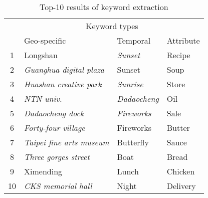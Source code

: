 \begin{table}[h]\scriptsize
\begin{center}
\caption{Top-10 results of keyword extraction}
\vspace{1mm}
{\scriptsize\begin{tabular}{ | c | p{24mm} | p{13mm}  | p{13mm} |}
    \hline
    & \multicolumn{3}{c|}{Keyword types} \\ 
    \cline{2-4}
     & \hspace{5mm} Geo-specific&\hspace{1mm}  Temporal &\hspace{1.5mm}  Attribute \\ \hline
    1 & Longshan &  \textit{Sunset}  & Recipe\\ \hline
    2 & \textit{Guanghua digital plaza} &  Sunset  & Soup \\ \hline
    3 & \textit{Huashan creative park} &  \textit{Sunrise}  & Store \\ \hline
    4 & \textit{NTN univ.} &  \textit{Dadaocheng}  & Oil \\ \hline
    5 & \textit{Dadaocheng dock} & \textit{Fireworks}   & Sale \\ \hline
    6 & \textit{Forty-four village}& Fireworks & Butter \\ \hline
    7 & \textit{Taipei fine arts museum} &  Butterfly   & Sauce \\ \hline
    8 & \textit{Three gorges street} & Boat   & Bread \\ \hline
    9 & Ximending & Lunch   & Chicken\\ \hline
    10 & \textit{CKS memorial hall} & Night  & Delivery \\ \hline
 \end{tabular}}
\end{center}
\label{tab:keywordex2}
\end{table}
\vspace{-2mm}